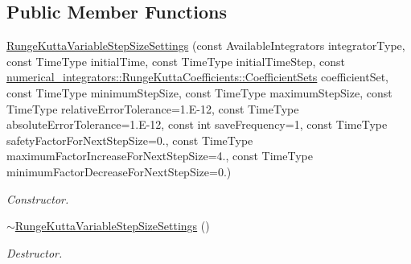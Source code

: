 \subsection*{Public Member Functions}
\begin{DoxyCompactItemize}
\item 
\hyperlink{classtudat_1_1numerical__integrators_1_1RungeKuttaVariableStepSizeSettings_a29982d03bc0f1fb95e59a17e6d14b135}{Runge\+Kutta\+Variable\+Step\+Size\+Settings} (const Available\+Integrators integrator\+Type, const Time\+Type initial\+Time, const Time\+Type initial\+Time\+Step, const \hyperlink{structtudat_1_1numerical__integrators_1_1RungeKuttaCoefficients_a462b6c2e353f7f84ce09e693fb6c7f17}{numerical\+\_\+integrators\+::\+Runge\+Kutta\+Coefficients\+::\+Coefficient\+Sets} coefficient\+Set, const Time\+Type minimum\+Step\+Size, const Time\+Type maximum\+Step\+Size, const Time\+Type relative\+Error\+Tolerance=1.\+E-\/12, const Time\+Type absolute\+Error\+Tolerance=1.\+E-\/12, const int save\+Frequency=1, const Time\+Type safety\+Factor\+For\+Next\+Step\+Size=0., const Time\+Type maximum\+Factor\+Increase\+For\+Next\+Step\+Size=4., const Time\+Type minimum\+Factor\+Decrease\+For\+Next\+Step\+Size=0.)
\begin{DoxyCompactList}\small\item\em Constructor. \end{DoxyCompactList}\item 
\hyperlink{classtudat_1_1numerical__integrators_1_1RungeKuttaVariableStepSizeSettings_a6af9737de9c5c100a923f99cda55b7e2}{$\sim$\+Runge\+Kutta\+Variable\+Step\+Size\+Settings} ()
\begin{DoxyCompactList}\small\item\em Destructor. \end{DoxyCompactList}\end{DoxyCompactItemize}

